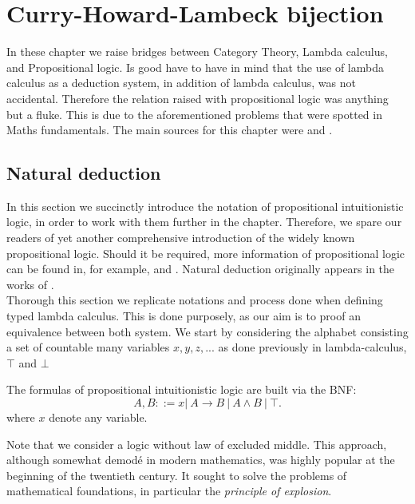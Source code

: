 
\chapter{Curry-Howard-Lambeck bijection}
In these chapter we raise bridges between Category Theory, Lambda calculus, and Propositional logic. Is good have to have in mind that the use of lambda calculus as a deduction system, in addition of lambda calculus, was not accidental. Therefore the relation raised with propositional logic was anything but a fluke. This is due to the aforementioned problems that were spotted in Maths fundamentals. The main sources for this chapter were  \cite{lambek1988introduction} and \cite[Chapter 6]{selinger2008lecture}.

\section{Natural deduction}
In this section we succinctly introduce the notation of propositional intuitionistic logic, in order to work with them further in the chapter. Therefore, we spare our readers of yet another comprehensive introduction of the widely known propositional logic. Should it be required, more information of propositional logic can be found in, for example, \cite{marek2009introduction} and \cite{wadler2015propositions}. Natural deduction originally appears in the works of \cite{gentzen1935untersuchungen}. \\

Thorough this section we replicate notations and process done when defining typed lambda calculus. This is done purposely, as our aim is to proof an equivalence between both system. We start by considering the alphabet consisting a set of countable many variables $x,y,z,...$ as done previously in lambda-calculus, $\top$ and $\bot$ 

\begin{definition}
  The formulas of propositional intuitionistic logic are built via the BNF:
  $$A,B ::= x |\ A\to B\ |\ A \land B \ |\ \top .$$
  where $x$ denote any variable.
\end{definition}


Note that we consider a logic without law of excluded middle. This approach, although somewhat demodé in modern mathematics, was highly popular at the beginning of the twentieth century. It sought to solve the problems of mathematical foundations, in particular the \emph{principle of explosion}. \\

